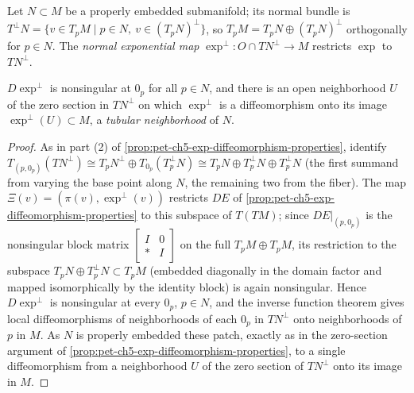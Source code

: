 \begin{definition}
  \label{def:pet-ch5-normal-exponential-map}
  Let $N\subset M$ be a properly embedded submanifold; its normal bundle is
  $T^\perp N=\{v\in T_pM\mid p\in N,\ v\in(T_pN)^\perp\}$, so $T_pM=T_pN\oplus
  (T_pN)^\perp$ orthogonally for $p\in N$. The \emph{normal exponential map}
  $\exp^\perp:O\cap TN^\perp\to M$ restricts $\exp$ to $TN^\perp$.
\end{definition}

\begin{corollary}
  \label{cor:pet-ch5-tubular-neighborhood}
  $D\exp^\perp$ is nonsingular at $0_p$ for all $p\in N$, and there is an open
  neighborhood $U$ of the zero section in $TN^\perp$ on which $\exp^\perp$ is a
  diffeomorphism onto its image $\exp^\perp(U)\subset M$, a \emph{tubular
  neighborhood} of $N$.
\end{corollary}
\begin{proof}
  As in part (2) of \cref{prop:pet-ch5-exp-diffeomorphism-properties}, identify
  $T_{(p,0_p)}(TN^\perp)\cong T_pN^\perp\oplus T_{0_p}(T_p^\perp N)\cong T_pN\oplus
  T_p^\perp N\oplus T_p^\perp N$ (the first summand from varying the base point along
  $N$, the remaining two from the fiber). The map $\Xi(v)=(\pi(v),\exp^\perp(v))$
  restricts $DE$ of \cref{prop:pet-ch5-exp-diffeomorphism-properties} to this
  subspace of $T(TM)$; since $DE|_{(p,0_p)}$ is the nonsingular block matrix
  $\begin{bmatrix}I&0\\ *&I\end{bmatrix}$ on the full $T_pM\oplus T_pM$, its
  restriction to the subspace $T_pN\oplus T_p^\perp N\subset T_pM$ (embedded
  diagonally in the domain factor and mapped isomorphically by the identity block) is
  again nonsingular. Hence $D\exp^\perp$ is nonsingular at every $0_p$, $p\in N$, and
  the inverse function theorem gives local diffeomorphisms of neighborhoods of each
  $0_p$ in $TN^\perp$ onto neighborhoods of $p$ in $M$. As $N$ is properly embedded
  these patch, exactly as in the zero-section argument of
  \cref{prop:pet-ch5-exp-diffeomorphism-properties}, to a single diffeomorphism from
  a neighborhood $U$ of the zero section of $TN^\perp$ onto its image in $M$.
\end{proof}

